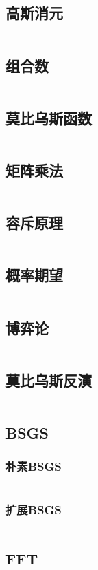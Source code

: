 \documentclass[a4paper,10pt]{article}
\begin{document}
\subsection{高斯消元}
\inputminted[breaklines, linenos]{c++}{math/gauss.cc}
\subsection{组合数}
\inputminted[breaklines, linenos]{c++}{math/combine.cc}
\subsection{莫比乌斯函数}
\inputminted[breaklines, linenos]{c++}{math/mobius.cc}
\subsection{矩阵乘法}
\inputminted[breaklines, linenos]{c++}{math/matrix.cc}
\subsection{容斥原理}
\inputminted[breaklines, linenos]{c++}{math/rongchi.cc}
\subsection{概率期望}
\inputminted[breaklines, linenos]{c++}{math/qiwang.cc}
\subsection{博弈论}
\inputminted[breaklines, linenos]{c++}{math/game.cc}
\subsection{莫比乌斯反演}
\inputminted[breaklines, linenos]{c++}{math/mf.cc}
\subsection{BSGS}
\subsubsection{朴素BSGS}
\inputminted[breaklines, linenos]{c++}{math/bsgs.cc}
\subsubsection{扩展BSGS}
\inputminted[breaklines, linenos]{c++}{math/ex_bsgs.cc}
\subsection{FFT}
\inputminted[breaklines, linenos]{c++}{math/fft.cc}
\end{document}
